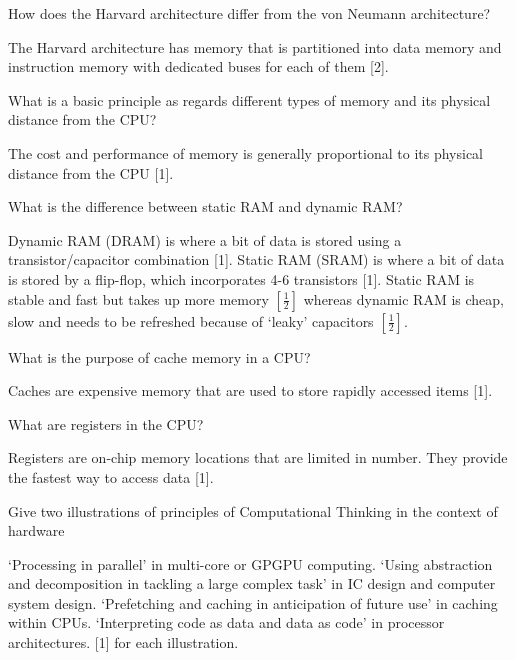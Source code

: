 \documentclass{exam}
\begin{document}
\begin{questions}
\question[2]How does the Harvard architecture differ from the von Neumann architecture?
\begin{solution}[.2in]
The Harvard architecture has memory that is partitioned into data
memory and instruction memory with dedicated buses for each of them
[2].
\end{solution}
\newpage
\question[1]What is a basic principle as regards different types of memory and its physical distance from the CPU?
\begin{solution}[.2in]
The cost and performance of memory is generally proportional to its
physical distance from the CPU [1].
\end{solution}

\question[3]What is the difference between static RAM and dynamic RAM?
\begin{solution}[.2in]
Dynamic RAM (DRAM) is where a bit of data is stored using a transistor/capacitor
combination [1]. Static RAM (SRAM) is where a bit
of data is stored by a flip-flop, which incorporates 4-6 transistors [1].
Static RAM is stable and fast but takes up more memory $[\frac{1}{2}]$ whereas
dynamic RAM is cheap, slow and needs to be refreshed because of
‘leaky’ capacitors $[\frac{1}{2}]$.
\end{solution}


\question[1]What is the purpose of cache memory in a CPU?
\begin{solution}[.2in]
Caches are expensive memory that are used to store rapidly accessed
items [1].
\end{solution}

\question[1]What are registers in the CPU?
\begin{solution}[.2in]
Registers are on-chip memory locations that are limited in number.
They provide the fastest way to access data [1].
\end{solution}

\question[2]Give two illustrations of principles of Computational Thinking in the context of hardware
\begin{solution}[.2in]
	‘Processing in parallel’ in multi-core or GPGPU computing. ‘Using
	abstraction and decomposition in tackling a large complex task’ in IC
	design and computer system design. ‘Prefetching and caching in anticipation
	of future use’ in caching within CPUs. ‘Interpreting code as data
	and data as code’ in processor architectures. [1] for each illustration.
\end{solution}





\end{questions}
\end{document}
